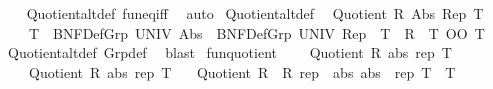 \begin{isabellebody}
%
\isadelimproof
\ \ %
\endisadelimproof
%
\isatagproof
{}\isamarkupfalse%
\ Quotient{\isacharunderscore}{\kern0pt}alt{\isacharunderscore}{\kern0pt}def{}\ fun{\isacharunderscore}{\kern0pt}eq{\isacharunderscore}{\kern0pt}iff\ \isamarkupfalse%
\ auto%
\endisatagproof
{\isafoldproof}%
%
\isadelimproof
\isanewline
%
\endisadelimproof
\isanewline
{}\isamarkupfalse%
\ Quotient{\isacharunderscore}{\kern0pt}alt{\isacharunderscore}{\kern0pt}def{}{\isacharcolon}{\kern0pt}\isanewline
\ \ {\isachardoublequoteopen}Quotient\ R\ Abs\ Rep\ T\ {\isasymlongleftrightarrow}\isanewline
\ \ \ \ T\ {\isasymle}\ BNF{\isacharunderscore}{\kern0pt}Def{\isachardot}{\kern0pt}Grp\ UNIV\ Abs\ {\isasymand}\ BNF{\isacharunderscore}{\kern0pt}Def{\isachardot}{\kern0pt}Grp\ UNIV\ Rep\ {\isasymle}\ T{\isasyminverse}{\isasyminverse}\ {\isasymand}\ R\ {\isacharequal}{\kern0pt}\ T\ OO\ T{\isasyminverse}{\isasyminverse}{\isachardoublequoteclose}\isanewline
%
\isadelimproof
\ \ %
\endisadelimproof
%
\isatagproof
{}\isamarkupfalse%
\ Quotient{\isacharunderscore}{\kern0pt}alt{\isacharunderscore}{\kern0pt}def{}\ Grp{\isacharunderscore}{\kern0pt}def\ \isamarkupfalse%
\ blast%
\endisatagproof
{\isafoldproof}%
%
\isadelimproof
\isanewline
%
\endisadelimproof
\isanewline
{}\isamarkupfalse%
\ fun{\isacharunderscore}{\kern0pt}quotient{\isacharcolon}{\kern0pt}\isanewline
\ \ \ {}{\isacharcolon}{\kern0pt}\ {\isachardoublequoteopen}Quotient\ R{}\ abs{}\ rep{}\ T{}{\isachardoublequoteclose}\isanewline
\ \ \ {}{\isacharcolon}{\kern0pt}\ {\isachardoublequoteopen}Quotient\ R{}\ abs{}\ rep{}\ T{}{\isachardoublequoteclose}\isanewline
\ \ \ {\isachardoublequoteopen}Quotient\ {\isacharparenleft}{\kern0pt}R{}\ {\isacharequal}{\kern0pt}{\isacharequal}{\kern0pt}{\isacharequal}{\kern0pt}{\isachargreater}{\kern0pt}\ R{}{\isacharparenright}{\kern0pt}\ {\isacharparenleft}{\kern0pt}rep{}\ {\isacharminus}{\kern0pt}{\isacharminus}{\kern0pt}{\isacharminus}{\kern0pt}{\isachargreater}{\kern0pt}\ abs{}{\isacharparenright}{\kern0pt}\ {\isacharparenleft}{\kern0pt}abs{}\ {\isacharminus}{\kern0pt}{\isacharminus}{\kern0pt}{\isacharminus}{\kern0pt}{\isachargreater}{\kern0pt}\ rep{}{\isacharparenright}{\kern0pt}\ {\isacharparenleft}{\kern0pt}T{}\ {\isacharequal}{\kern0pt}{\isacharequal}{\kern0pt}{\isacharequal}{\kern0pt}{\isachargreater}{\kern0pt}\ T{}{\isacharparenright}{\kern0pt}{\isachardoublequoteclose}\isanewline

\end{isabellebody}
